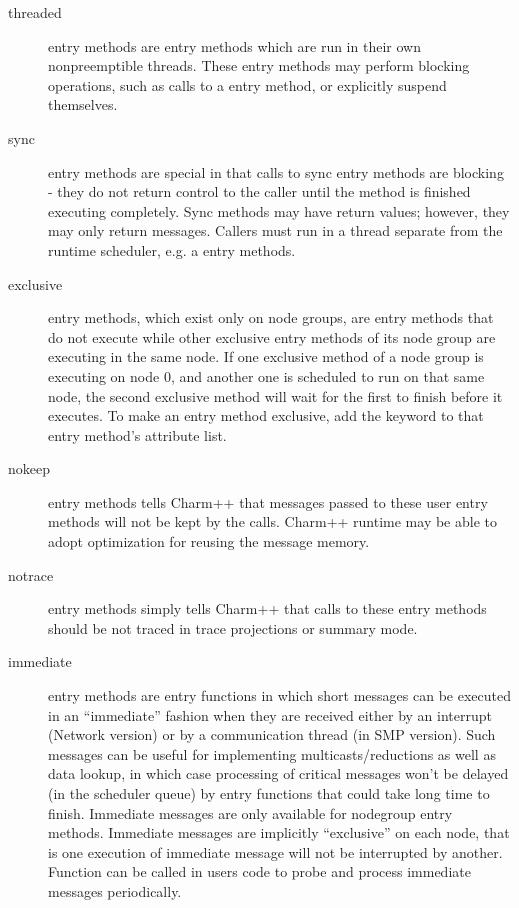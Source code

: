 \begin{description}
\item[threaded] entry methods are
entry methods which are run in their own nonpreemptible threads. These
entry methods may perform blocking operations, such as calls to a
 entry method, or explicitly suspend themselves.

\item[sync] entry methods are special in that calls to
sync entry methods are blocking - they do not return control to the caller
until the method is finished executing completely.  Sync methods may have
return values; however, they may only return messages. Callers must run in a
thread separate from the runtime scheduler, e.g. a  entry methods.

\item[exclusive] entry methods, which exist only on node groups, are
entry methods that do not execute while other exclusive
entry methods of its node group are executing in the same
node.  If one exclusive method of a node group is executing on node 0, and
another one is scheduled to run on that same node, the second exclusive method
will wait for the first to finish before it executes.  To make an entry method exclusive, add the keyword  to that
entry method's attribute list.

\item[nokeep] entry methods tells Charm++ that messages passed to
these user entry methods will not be kept by the calls. Charm++ runtime
may be able to adopt optimization for reusing the message memory.

\item[notrace] entry methods simply tells Charm++ that calls to 
these entry methods should be not traced in trace projections or summary mode.

\item[immediate] entry methods are entry functions in which 
short messages can be executed in an ``immediate'' fashion when they are
received either by an interrupt (Network version) or by a communication thread
(in SMP version). Such messages can be useful for implementing
multicasts/reductions as well as data lookup, in which case processing of
critical messages won't be delayed (in the scheduler queue) by entry functions
that could take long time to finish. Immediate messages are only available for
nodegroup entry methods. Immediate messages are implicitly ``exclusive'' on each
node, that is one execution of immediate message will not be interrupted by
another. Function  can be called in users code to
probe and process immediate messages periodically.


\end{description}
